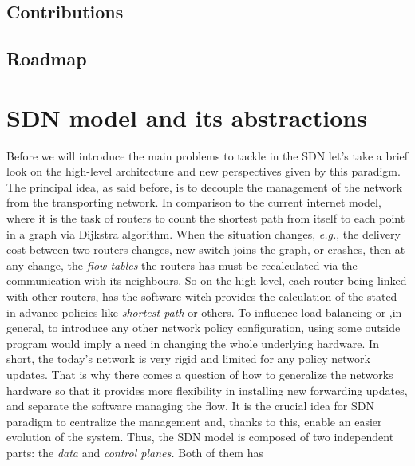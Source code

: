\documentclass{article}
\theoremstyle{remark}
\begin{document}
  
\subsection{Contributions}
\subsection{Roadmap}
\section{SDN model and its abstractions}
   Before we will introduce the main problems to tackle in the SDN let's take a brief look on the high-level architecture and new perspectives given by this paradigm.
The principal idea, as said before, is to decouple the management of the network from the transporting network. In comparison to the current internet model, where it is the task of routers to count the shortest path from itself to each point in a graph via Dijkstra algorithm. When the situation changes, \emph{e.g.}, the delivery cost between two routers changes, new switch joins the graph, or crashes, then at any change, the \emph{flow tables} the routers has must be recalculated via the communication with its neighbours. So on the high-level, each router being linked with other routers, has the software witch provides the calculation of the stated in advance policies like \emph{shortest-path} or others. To influence load balancing or ,in general, to introduce any other network policy configuration, using some outside program would imply a need in changing the whole underlying hardware. In short, the today's network is very rigid and limited for any policy network updates.
That is why there comes a question of how to generalize the 
networks hardware so that it provides more flexibility in 
installing new forwarding updates, and separate the software 
managing the flow. It is the crucial idea for SDN paradigm
 to centralize the management and, thanks to this, enable an
 easier evolution of the system. 
Thus, the SDN model is composed of two independent parts:
 the \emph{data} and \emph{control planes.} Both of them has
\end{document}
